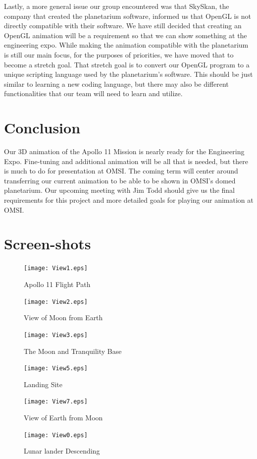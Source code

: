 \documentclass[onecolumn, draftclsnofoot,10pt, compsoc]{IEEEtran}
\begin{document}
Lastly, a more general issue our group encountered was that SkySkan, the company that created the planetarium software, informed us that OpenGL is not directly compatible with their software. We have still decided that creating an OpenGL animation will be a requirement so that we can show something at the engineering expo. While making the animation compatible with the planetarium is still our main focus, for the purposes of priorities, we have moved that to become a stretch goal. That stretch goal is to convert our OpenGL program to a unique scripting language used by the planetarium's software. This should be just similar to learning a new coding language, but there may also be different functionalities that our team will need to learn and utilize. 

\section{Conclusion}

Our 3D animation of the Apollo 11 Mission is nearly ready for the Engineering Expo. Fine-tuning and additional animation will be all that is needed, but there is much to do for presentation at OMSI. The coming term will center around transferring our current animation to be able to be shown in OMSI's domed planetarium. Our upcoming meeting with Jim Todd should give us the final requirements for this project and more detailed goals for playing our animation at OMSI. 

\newpage
\section{Screen-shots}

\begin{figure}[!htb]
    \texttt{[image: View1.eps]}
    \centering
    \caption{Apollo 11 Flight Path}

\end{figure}

\begin{figure}[!htb]
    \centering
    \texttt{[image: View2.eps]}
    \caption{View of Moon from Earth}

\end{figure}

\begin{figure}[!htb]
    \centering
    \texttt{[image: View3.eps]}
    \caption{The Moon and Tranquility Base}

\end{figure}

\begin{figure}[!htb]
    \centering
    \texttt{[image: View5.eps]}  \caption{Landing Site}
\end{figure}

\begin{figure}[!htb]
    \centering
    \texttt{[image: View7.eps]}
    \caption{View of Earth from Moon}
\end{figure}

\begin{figure}[!htb]
    \centering
    \texttt{[image: View0.eps]}  \caption{Lunar lander Descending}
\end{figure}
\end{document}
